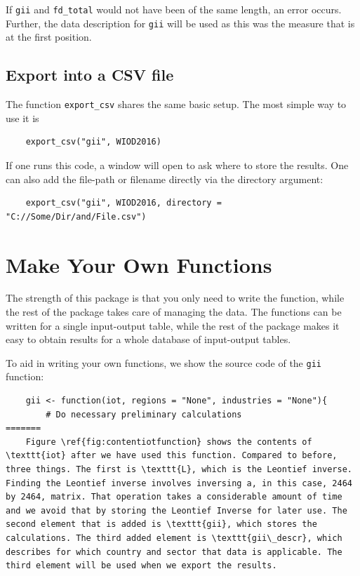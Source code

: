 \documentclass[10pt,a4paper]{paper}
\begin{document}
\begin{itemize}
	If \texttt{gii} and \texttt{fd\_total} would not have been of the same length, an error occurs. Further, the data description for \texttt{gii} will be used as this was the measure that is at the first position.
	
	\subsection{Export into a CSV file}
	The function \texttt{export\_csv} shares the same basic setup. The most simple way to use it is
	\begin{Verbatim}
	export_csv("gii", WIOD2016)
	\end{Verbatim}
	If one runs this code, a window will open to ask where to store the results. One can also add the file-path or filename directly via the directory argument:
	\begin{Verbatim}
	export_csv("gii", WIOD2016, directory = "C://Some/Dir/and/File.csv")
	\end{Verbatim}
	\section{Make Your Own Functions}
	\label{sec:ownfunction}
	The strength of this package is that you only need to write the function, while the rest of the package takes care of managing the data. The functions can be written for a single input-output table, while the rest of the package makes it easy to obtain results for a whole database of input-output tables.
	
	To aid in writing your own functions, we show the source code of the \texttt{gii} function:
	\begin{Verbatim}
	gii <- function(iot, regions = "None", industries = "None"){
		# Do necessary preliminary calculations
=======
	Figure \ref{fig:contentiotfunction} shows the contents of \texttt{iot} after we have used this function. Compared to before, three things. The first is \texttt{L}, which is the Leontief inverse. Finding the Leontief inverse involves inversing a, in this case, 2464 by 2464, matrix. That operation takes a considerable amount of time and we avoid that by storing the Leontief Inverse for later use. The second element that is added is \texttt{gii}, which stores the calculations. The third added element is \texttt{gii\_descr}, which describes for which country and sector that data is applicable. The third element will be used when we export the results.
	

\end{Verbatim}
\end{itemize}
\end{document}
